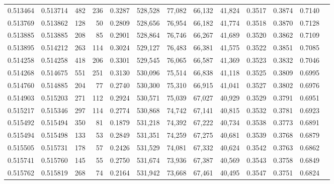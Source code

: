 \begin{tabular}{rrrrrrrrrrrrr}
0.513464 & 0.513714 &   482 &   236 &                                     0.3287 & 528,528 &  77,082 &  66,132 &  41,824 & 0.3517 & 0.3874 & 0.7140 \\
0.513769 & 0.513862 &   128 &    50 &                                     0.2809 & 528,656 &  76,954 &  66,182 &  41,774 & 0.3518 & 0.3870 & 0.7128 \\
0.513885 & 0.513885 &   208 &    85 &                                     0.2901 & 528,864 &  76,746 &  66,267 &  41,689 & 0.3520 & 0.3862 & 0.7109 \\
0.513895 & 0.514212 &   263 &   114 &                                     0.3024 & 529,127 &  76,483 &  66,381 &  41,575 & 0.3522 & 0.3851 & 0.7085 \\
0.514258 & 0.514258 &   418 &   206 &                                     0.3301 & 529,545 &  76,065 &  66,587 &  41,369 & 0.3523 & 0.3832 & 0.7046 \\
0.514268 & 0.514675 &   551 &   251 &                                     0.3130 & 530,096 &  75,514 &  66,838 &  41,118 & 0.3525 & 0.3809 & 0.6995 \\
0.514760 & 0.514885 &   204 &    77 &                                     0.2740 & 530,300 &  75,310 &  66,915 &  41,041 & 0.3527 & 0.3802 & 0.6976 \\
0.514903 & 0.515203 &   271 &   112 &                                     0.2924 & 530,571 &  75,039 &  67,027 &  40,929 & 0.3529 & 0.3791 & 0.6951 \\
0.515217 & 0.515346 &   297 &   114 &                                     0.2774 & 530,868 &  74,742 &  67,141 &  40,815 & 0.3532 & 0.3781 & 0.6923 \\
0.515492 & 0.515494 &   350 &    81 &                                     0.1879 & 531,218 &  74,392 &  67,222 &  40,734 & 0.3538 & 0.3773 & 0.6891 \\
0.515494 & 0.515498 &   133 &    53 &                                     0.2849 & 531,351 &  74,259 &  67,275 &  40,681 & 0.3539 & 0.3768 & 0.6879 \\
0.515505 & 0.515731 &   178 &    57 &                                     0.2426 & 531,529 &  74,081 &  67,332 &  40,624 & 0.3542 & 0.3763 & 0.6862 \\
0.515741 & 0.515760 &   145 &    55 &                                     0.2750 & 531,674 &  73,936 &  67,387 &  40,569 & 0.3543 & 0.3758 & 0.6849 \\
0.515762 & 0.515819 &   268 &    74 &                                     0.2164 & 531,942 &  73,668 &  67,461 &  40,495 & 0.3547 & 0.3751 & 0.6824 \\

\end{tabular}
